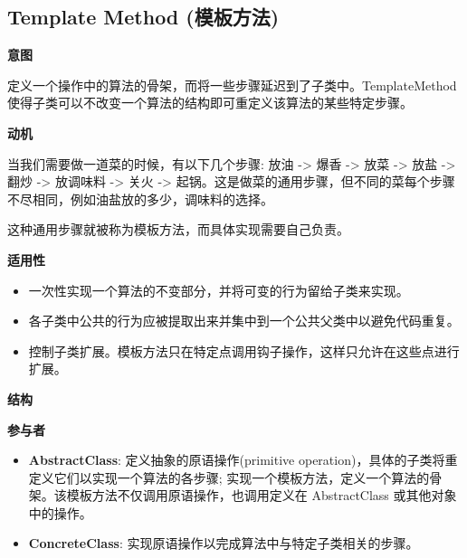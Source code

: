 \subsection{Template Method (模板方法)}

\noindent\textbf{意图}

定义一个操作中的算法的骨架，而将一些步骤延迟到了子类中。TemplateMethod 使得子类可以不改变一个算法的结构即可重定义该算法的某些特定步骤。

\noindent\textbf{动机}

当我们需要做一道菜的时候，有以下几个步骤: 放油 -> 爆香 -> 放菜 -> 放盐 -> 翻炒 -> 放调味料 -> 关火 -> 起锅。这是做菜的通用步骤，但不同的菜每个步骤不尽相同，例如油盐放的多少，调味料的选择。

这种通用步骤就被称为模板方法，而具体实现需要自己负责。

\noindent\textbf{适用性}

\begin{itemize}
    \item 一次性实现一个算法的不变部分，并将可变的行为留给子类来实现。
    \item 各子类中公共的行为应被提取出来并集中到一个公共父类中以避免代码重复。
    \item 控制子类扩展。模板方法只在特定点调用钩子操作，这样只允许在这些点进行扩展。
\end{itemize}

\noindent\textbf{结构}

\begin{figure}[H]
    \scriptsize
    \centering
\end{figure}

\noindent\textbf{参与者}

\begin{itemize}
    \item \textbf{AbstractClass}: 定义抽象的原语操作(primitive operation)，具体的子类将重定义它们以实现一个算法的各步骤; 实现一个模板方法，定义一个算法的骨架。该模板方法不仅调用原语操作，也调用定义在 AbstractClass 或其他对象中的操作。
    \item \textbf{ConcreteClass}: 实现原语操作以完成算法中与特定子类相关的步骤。
\end{itemize}

